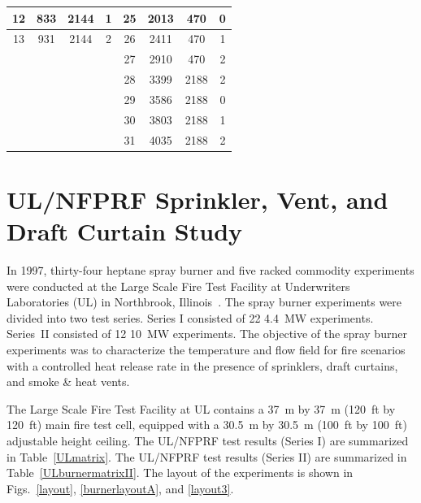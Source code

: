 \begin{table}[h!]
\begin{center}
\begin{tabular}{|c|c|c|c||c|c|c|c|}
12      & 833       & 2144          & 1         & 25      & 2013      & 470           & 0                 \\ \hline
13      & 931       & 2144          & 2         & 26      & 2411      & 470           & 1                 \\ \hline
\multicolumn{4}{|r||}{}                         & 27      & 2910      & 470           & 2                 \\ \cline{5-8}
\multicolumn{4}{|r||}{}                         & 28      & 3399      & 2188          & 2                 \\ \cline{5-8}
\multicolumn{4}{|r||}{}                         & 29      & 3586      & 2188          & 0                 \\ \cline{5-8}
\multicolumn{4}{|r||}{}                         & 30      & 3803      & 2188          & 1                 \\ \cline{5-8}
\multicolumn{4}{|r||}{}                         & 31      & 4035      & 2188          & 2                 \\ \hline
\end{tabular}
\end{center}
\label{UL_NIST_Table}
\end{table}


\FloatBarrier

\section{UL/NFPRF Sprinkler, Vent, and Draft Curtain Study}
\label{UL_NFPRF_Description}

In 1997, thirty-four heptane spray burner and five racked commodity experiments were conducted at the Large Scale Fire Test Facility at Underwriters Laboratories (UL) in Northbrook, Illinois~\cite{Sheppard:1,McGrattan:5}. The spray burner experiments were divided into two test series. Series I consisted of 22 4.4~MW experiments. Series~II consisted of 12 10~MW experiments. The objective of the spray burner experiments was to characterize the temperature and flow field for fire scenarios with a controlled heat release rate in the presence of sprinklers, draft curtains, and smoke \& heat vents.

The Large Scale Fire Test Facility at UL contains a 37~m by 37~m (120~ft by 120~ft) main fire test cell, equipped with a 30.5~m by 30.5~m (100~ft by 100~ft) adjustable height ceiling. The UL/NFPRF test results (Series I) are summarized in Table~\ref{ULmatrix}. The UL/NFPRF test results (Series II) are summarized in Table~\ref{ULburnermatrixII}. The layout of the experiments is shown in Figs.~\ref{layout}, \ref{burnerlayoutA}, and \ref{layout3}.

